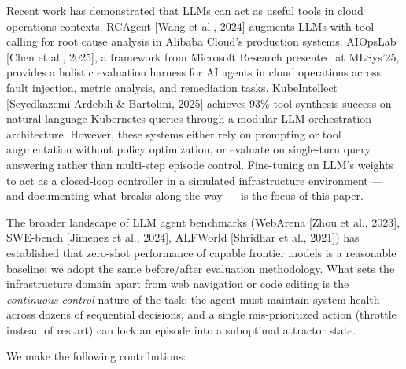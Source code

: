 \documentclass{article}
\begin{document}
Recent work has demonstrated that LLMs can act as useful tools in cloud operations
contexts. RCAgent [Wang et al., 2024] augments LLMs with tool-calling for root cause
analysis in Alibaba Cloud's production systems. AIOpsLab [Chen et al., 2025], a
framework from Microsoft Research presented at MLSys'25, provides a holistic evaluation
harness for AI agents in cloud operations across fault injection, metric analysis, and
remediation tasks. KubeIntellect [Seyedkazemi Ardebili \& Bartolini, 2025] achieves
93\% tool-synthesis success on natural-language Kubernetes queries through a modular
LLM orchestration architecture. However, these systems either rely on prompting or tool
augmentation without policy optimization, or evaluate on single-turn query answering
rather than multi-step episode control. Fine-tuning an LLM's weights to act as a
closed-loop controller in a simulated infrastructure environment --- and documenting
what breaks along the way --- is the focus of this paper.

The broader landscape of LLM agent benchmarks (WebArena [Zhou et al., 2023], SWE-bench
[Jimenez et al., 2024], ALFWorld [Shridhar et al., 2021]) has established that zero-shot
performance of capable frontier models is a reasonable baseline; we adopt the same
before/after evaluation methodology. What sets the infrastructure domain apart from web
navigation or code editing is the \textit{continuous control} nature of the task: the
agent must maintain system health across dozens of sequential decisions, and a single
mis-prioritized action (throttle instead of restart) can lock an episode into a
suboptimal attractor state.

We make the following contributions:
\end{document}

